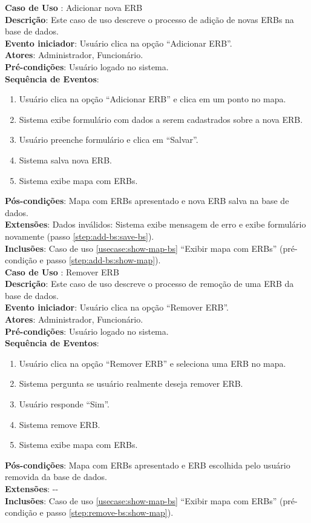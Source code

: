 \documentclass[]{politex}
\begin{document}
\noindent \textbf{Caso de Uso }: Adicionar nova ERB \\
\textbf{Descrição}: Este caso de uso descreve o processo de adição de novas
ERBs na base de dados. \\
\textbf{Evento iniciador}: Usuário clica na opção ``Adicionar ERB''. \\
\textbf{Atores}: Administrador, Funcionário. \\
\textbf{Pré-condições}: Usuário logado no sistema. \\
\textbf{Sequência de Eventos}:
\begin{enumerate}
\item Usuário clica na opção ``Adicionar ERB'' e clica em um ponto no mapa.
\item Sistema exibe formulário com dados a serem cadastrados sobre a nova ERB.
\item Usuário preenche formulário e clica em ``Salvar''.
\item\label{step:add-bs:save-bs} Sistema salva nova ERB.
\item\label{step:add-bs:show-map} Sistema exibe mapa com ERBs.
\end{enumerate}
\textbf{Pós-condições}: Mapa com ERBs apresentado e nova ERB salva na base de
dados. \\
\textbf{Extensões}: Dados inválidos: Sistema exibe mensagem de erro e exibe
formulário novamente (passo \ref{step:add-bs:save-bs}). \\
\textbf{Inclusões}: Caso de uso \ref{usecase:show-map-bs} ``Exibir mapa com ERBs'' (pré-condição e passo \ref{step:add-bs:show-map}).\\

\noindent \textbf{Caso de Uso }: Remover ERB \\
\textbf{Descrição}: Este caso de uso descreve o processo de remoção de uma ERB da
base de dados. \\
\textbf{Evento iniciador}: Usuário clica na opção ``Remover ERB''. \\
\textbf{Atores}: Administrador, Funcionário. \\
\textbf{Pré-condições}: Usuário logado no sistema. \\
\textbf{Sequência de Eventos}:
\begin{enumerate}
\item Usuário clica na opção ``Remover ERB'' e seleciona uma ERB no mapa.
\item Sistema pergunta se usuário realmente deseja remover ERB.
\item Usuário responde ``Sim''.
\item Sistema remove ERB.
\item\label{step:remove-bs:show-map} Sistema exibe mapa com ERBs.
\end{enumerate}
\textbf{Pós-condições}: Mapa com ERBs apresentado e ERB escolhida pelo usuário
removida da base de dados. \\
\textbf{Extensões}: -{}- \\
\textbf{Inclusões}: Caso de uso \ref{usecase:show-map-bs} ``Exibir mapa com ERBs'' (pré-condição e passo \ref{step:remove-bs:show-map}). \\
\end{document}
